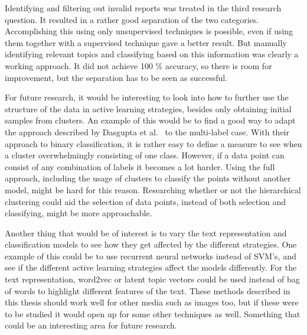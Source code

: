 Identifying and filtering out invalid reports was treated in the third research question.
It resulted in a rather good separation of the two categories.
Accomplishing this using only unsupervised techniques is possible, even if using them together with a supervised technique gave a better result.
But manually identifying relevant topics and classifying based on this information was clearly a working approach.
It did not achieve 100 \% accuracy, so there is room for improvement, but the separation has to be seen as successful.

For future research, it would be interesting to look into how to further use the structure of the data in active learning strategies, besides only obtaining initial samples from clusters.
An example of this would be to find a good way to adapt the approach described by Dasgupta et al\@.~\cite{dasgupta2008hierarchical} to the multi-label case.
With their approach to binary classification, it is rather easy to define a measure to see when a cluster overwhelmingly consisting of one class.
However, if a data point can consist of any combination of labels it becomes a lot harder.
Using the full approach, including the usage of clusters to classify the points without another model, might be hard for this reason.
Researching whether or not the hierarchical clustering could aid the selection of data points, instead of both selection and classifying, might be more approachable.

Another thing that would be of interest is to vary the text representation and classification models to see how they get affected by the different strategies.
One example of this could be to use recurrent neural networks instead of SVM's, and see if the different active learning strategies affect the models differently.
For the text representation, word2vec or latent topic vectors could be used instead of bag of words to highlight different features of the text.
These methods described in this thesis should work well for other media such as images too, but if these were to be studied it would open up for some other techniques as well.
Something that could be an interesting area for future research.